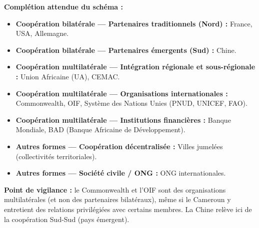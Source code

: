 \documentclass[11pt]{article}
\begin{document}
\begin{corrige}
\textbf{Complétion attendue du schéma :}
\begin{itemize}
    \item \textbf{Coopération bilatérale — Partenaires traditionnels (Nord) :} France, USA, Allemagne.
    \item \textbf{Coopération bilatérale — Partenaires émergents (Sud) :} Chine.
    \item \textbf{Coopération multilatérale — Intégration régionale et sous-régionale :} Union Africaine (UA), CEMAC.
    \item \textbf{Coopération multilatérale — Organisations internationales :} Commonwealth, OIF, Système des Nations Unies (PNUD, UNICEF, FAO).
    \item \textbf{Coopération multilatérale — Institutions financières :} Banque Mondiale, BAD (Banque Africaine de Développement).
    \item \textbf{Autres formes — Coopération décentralisée :} Villes jumelées (collectivités territoriales).
    \item \textbf{Autres formes — Société civile / ONG :} ONG internationales.
\end{itemize}
\textbf{Point de vigilance :} le Commonwealth et l'OIF sont des organisations multilatérales (et non des partenaires bilatéraux), même si le Cameroun y entretient des relations privilégiées avec certains membres. La Chine relève ici de la coopération Sud-Sud (pays émergent).
\end{corrige}
\end{document}

